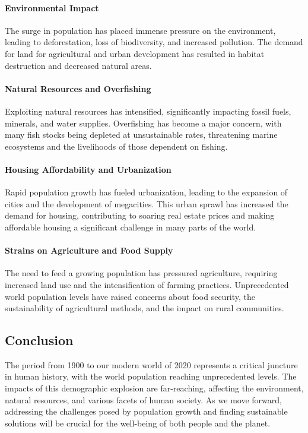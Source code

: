 \documentclass[a4paper,12pt]{book}
\begin{document}
\paragraph{Environmental Impact}
The surge in population has placed immense pressure on the environment, leading to deforestation, loss of biodiversity, and increased pollution. The demand for land for agricultural and urban development has resulted in habitat destruction and decreased natural areas.

\paragraph{Natural Resources and Overfishing}
Exploiting natural resources has intensified, significantly impacting fossil fuels, minerals, and water supplies. Overfishing has become a major concern, with many fish stocks being depleted at unsustainable rates, threatening marine ecosystems and the livelihoods of those dependent on fishing.

\paragraph{Housing Affordability and Urbanization}
Rapid population growth has fueled urbanization, leading to the expansion of cities and the development of megacities. This urban sprawl has increased the demand for housing, contributing to soaring real estate prices and making affordable housing a significant challenge in many parts of the world.

\paragraph{Strains on Agriculture and Food Supply}
The need to feed a growing population has pressured agriculture, requiring increased land use and the intensification of farming practices. Unprecedented world population levels have raised concerns about food security, the sustainability of agricultural methods, and the impact on rural communities.

\subsection*{Conclusion}
The period from 1900 to our modern world of 2020 represents a critical juncture in human history, with the world population reaching unprecedented levels. The impacts of this demographic explosion are far-reaching, affecting the environment, natural resources, and various facets of human society. As we move forward, addressing the challenges posed by population growth and finding sustainable solutions will be crucial for the well-being of both people and the planet.
\end{document}
